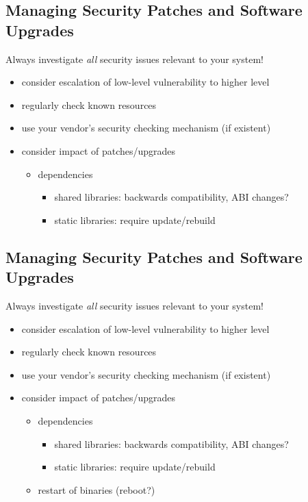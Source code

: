 \documentclass[xga]{xdvislides}
\begin{document}
\subsection{Managing Security Patches and Software Upgrades}
Always investigate {\em all} security issues relevant to your system!
\begin{itemize}
	\item consider escalation of low-level vulnerability to higher level
	\item regularly check known resources
	\item use your vendor's security checking mechanism (if existent)
	\item consider impact of patches/upgrades
		\begin{itemize}
			\item dependencies
				\begin{itemize}
					\item shared libraries:  backwards compatibility, ABI
						changes?
					\item static libraries:  require update/rebuild
				\end{itemize}
		\end{itemize}
\end{itemize}

\subsection{Managing Security Patches and Software Upgrades}
Always investigate {\em all} security issues relevant to your system!
\begin{itemize}
	\item consider escalation of low-level vulnerability to higher level
	\item regularly check known resources
	\item use your vendor's security checking mechanism (if existent)
	\item consider impact of patches/upgrades
		\begin{itemize}
			\item dependencies
				\begin{itemize}
					\item shared libraries:  backwards compatibility, ABI
						changes?
					\item static libraries:  require update/rebuild
				\end{itemize}
			\item restart of binaries (reboot?)
		\end{itemize}
\end{itemize}
\end{document}
